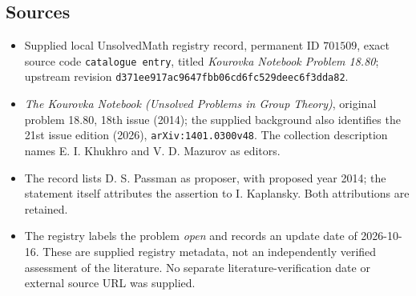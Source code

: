 \documentclass[11pt]{article}
\begin{document}
\subsection{Sources}
\begin{itemize}
\item Supplied local UnsolvedMath registry record, permanent ID \(701509\), exact source code \texttt{catalogue entry}, titled \emph{Kourovka Notebook Problem 18.80}; upstream revision \texttt{d371ee917ac9647fbb06cd6fc529deec6f3dda82}.
\item \emph{The Kourovka Notebook (Unsolved Problems in Group Theory)}, original problem 18.80, 18th issue (2014); the supplied background also identifies the 21st issue edition (2026), \texttt{arXiv:1401.0300v48}. The collection description names E. I. Khukhro and V. D. Mazurov as editors.
\item The record lists D. S. Passman as proposer, with proposed year 2014; the statement itself attributes the assertion to I. Kaplansky. Both attributions are retained.
\item The registry labels the problem \emph{open} and records an update date of 2026-10-16. These are supplied registry metadata, not an independently verified assessment of the literature. No separate literature-verification date or external source URL was supplied.
\end{itemize}
\end{document}
